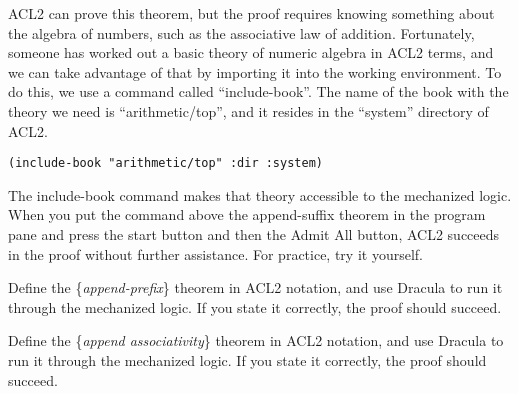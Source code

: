 ACL2 can prove this theorem, but the proof requires knowing something about the algebra of numbers, such as the associative law of addition. Fortunately, someone has worked out a basic theory of numeric algebra in ACL2 terms, and we can take advantage of that by importing it into the working environment. To do this, we use a command called ``include-book''. The name of the book with the theory we need is ``arithmetic/top'', and it resides in the ``system'' directory of ACL2.

\begin{lstlisting}
(include-book "arithmetic/top" :dir :system)
\end{lstlisting}

The include-book command makes that theory accessible to the mechanized logic. When you put the command above the append-suffix theorem in the program pane and press the start button and then the Admit All button, ACL2 succeeds in the proof without further assistance. For practice, try it yourself.

\begin{ExerciseList}
\Exercise Define the \{\emph{append-prefix}\} theorem in ACL2 notation, and use Dracula to run it through the mechanized logic. If you state it correctly, the proof should succeed.

\Exercise Define the \{\emph{append associativity}\} theorem in ACL2 notation, and use Dracula to run it through the mechanized logic. If you state it correctly, the proof should succeed.
\end{ExerciseList}


